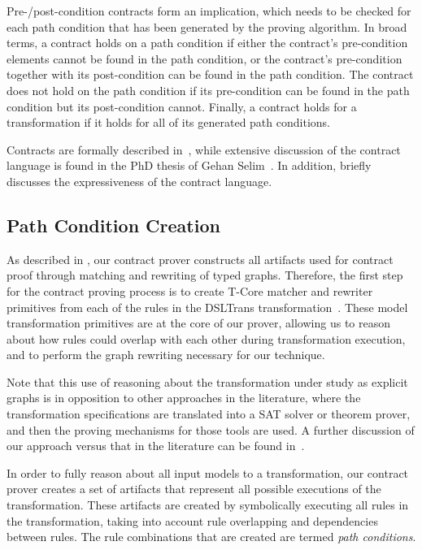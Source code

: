  Pre-/post-condition contracts form an implication, which needs to be checked
 for each path condition that has been generated by the proving algorithm. In broad
 terms, a contract holds on a path condition if either the contract's
 pre-condition elements cannot be found in the path condition, or the contract's pre-condition
 together with its post-condition can be found in the path condition. The contract
 does not hold on the path condition if its pre-condition can be
 found in the path condition but its post-condition cannot. Finally, a contract
 holds for a transformation if it holds for all of its generated path conditions.

 Contracts are formally described in~\cite{Lucio2014}, while extensive discussion of the contract language is found in the PhD thesis of Gehan Selim~\cite{Selim2015}. In addition, \cite{Oakes2016} briefly discusses the expressiveness of the contract language.

\subsection{Path Condition Creation}
\label{subsec:contract_prover}

As described in \cite{Lucio2015}, our contract prover constructs all artifacts used for contract proof through matching and rewriting of typed graphs. Therefore, the first step for the contract proving process is to create T-Core matcher and rewriter primitives from each of the rules
in the DSLTrans transformation~\cite{Syriani2013}. These model transformation primitives are at the core of our prover, allowing us to
reason about how rules could overlap with each other during transformation
execution, and to perform the graph rewriting necessary for our technique.

Note that this use of reasoning about the transformation under study as explicit graphs is in opposition to other approaches in the literature, where the transformation specifications are translated into a SAT solver or theorem prover, and then the proving mechanisms for those tools are used. A further discussion of our approach versus that in the literature can be found in~\cite{Selim2015}.

In order to fully reason about all input models to a transformation, our contract prover creates a set of artifacts that represent all
possible executions of the transformation. These artifacts are created by
symbolically executing all rules in the transformation, taking into account
rule overlapping and dependencies between rules. The rule combinations that are
created are termed \textit{path conditions}.

